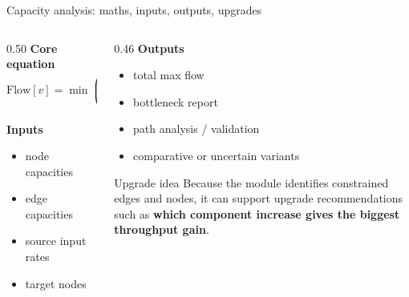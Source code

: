 \documentclass[aspectratio=169]{beamer}
\newcommand{\tightlist}{\setlength{\itemsep}{4pt}\setlength{\parskip}{2pt}}
\begin{document}
\begin{frame}{Capacity analysis: maths, inputs, outputs, upgrades}
\small
\begin{columns}[t]
\begin{column}{0.50\textwidth}
\textbf{Core equation}
\[
\mathrm{Flow}[v] = \min\!\left(\sum_{u\in parents(v)} \min(\mathrm{Flow}[u], c_{uv}),\; c_v\right)
\]

\textbf{Inputs}
\begin{itemize}
\tightlist
\item node capacities
\item edge capacities
\item source input rates
\item target nodes
\end{itemize}
\end{column}

\begin{column}{0.46\textwidth}
\textbf{Outputs}
\begin{itemize}
\tightlist
\item total max flow
\item bottleneck report
\item path analysis / validation
\item comparative or uncertain variants
\end{itemize}

\vspace{0.15cm}
\begin{block}{Upgrade idea}
\small
Because the module identifies constrained edges and nodes, it can support upgrade recommendations such as \textbf{which component increase gives the biggest throughput gain}.
\end{block}
\end{column}
\end{columns}
\end{frame}
\end{document}
